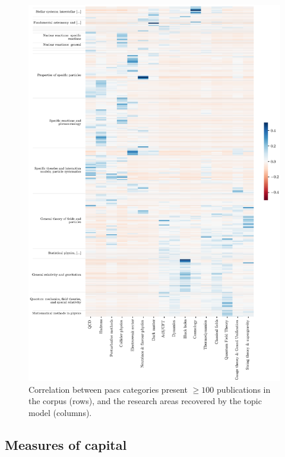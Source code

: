 \documentclass{article}
\begin{document}
\begin{figure}[H]
    \centering
    \includegraphics[height=0.73\paperheight
]{plots/pacs_clustermap.eps}
    \caption{Correlation between \gls{pacs} categories present $\geq 100$ publications in the corpus (rows), and the research areas recovered by the topic model (columns).}
\end{figure}


\subsection{\label{appendix:capital_validation}Measures of capital}
\end{document}
